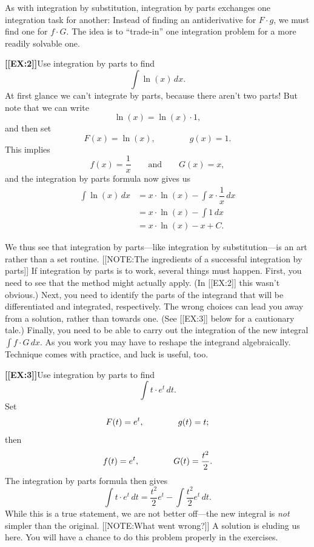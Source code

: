 As with integration by substitution, integration by parts exchanges
one integration task for another: Instead of finding an antiderivative
for $F \cdot g$, we must find one for $f \cdot G$.  The idea is to
``trade-in'' one integration problem for a more readily solvable one.






{\bf [[EX:2]]}\quad  Use integration by parts to find\label{lnder}
	\[
\int \ln(x) \, dx.
\]
At first glance we can't integrate by parts, because there aren't two parts!  But note that we can write
	\[
\ln(x) = \ln(x) \cdot 1,
\]
and then set 
	\[
F(x) = \ln(x), \qquad \qquad g(x) = 1.
\]
This implies 
	\[
f(x) = \dfrac{1}{x} \qquad \mbox{and} \qquad
		G(x) = x,
\]
and the integration by parts formula now gives us
\begin{align*}
\int \ln(x) \, dx 
  &= x \cdot \ln(x) - \int x \cdot \dfrac{1}{x} \, dx \\[4pt]
  &= x \cdot \ln(x) - \int 1 \, dx \\[4pt]
  &= x \cdot \ln(x) - x + C.
\end{align*}


We thus see that integration by parts---like integration by substitution---is an art rather than a
set routine.
[[NOTE:The ingredients  of a successful  integration by parts]]	
If integration by parts is to work, several things must happen.
First, you need to see that the method might actually apply.  (In
[[EX:2]] this wasn't obvious.)  Next, you need to identify the parts
of the integrand that will be differentiated and integrated,
respectively.  The wrong choices can lead you away from a solution,
rather than towards one.  (See [[EX:3]] below for a cautionary
tale.)  Finally,
you need to be able to carry out the integration of the new integral
$\int f \cdot G \, dx$.  As you work you may have to reshape the
integrand algebraically.  Technique comes with practice, and luck is
useful, too.





{\bf [[EX:3]]}\quad  Use integration by parts to find
	\[
\int t \cdot e^t \, dt.
\]
Set
	\[
F(t) = e^t, \qquad \mbox \qquad g(t) = t;
\]
then 
	\[
f(t) = e^t, \qquad \mbox \qquad G(t) = \dfrac{t^2}{2}.
\]
The integration by parts formula then gives
	\[
\int t \cdot e^t \, dt =
		\dfrac{t^2}{2} e^t - \int \dfrac{t^2}{2} e^t\,dt.
\]
While this is a true statement, we are not better off---the new
integral is {\em not\/} simpler than the original.  [[NOTE:What went
  wrong?]]  A solution is eluding us here.  You will have a chance to
do this problem properly in the exercises.


